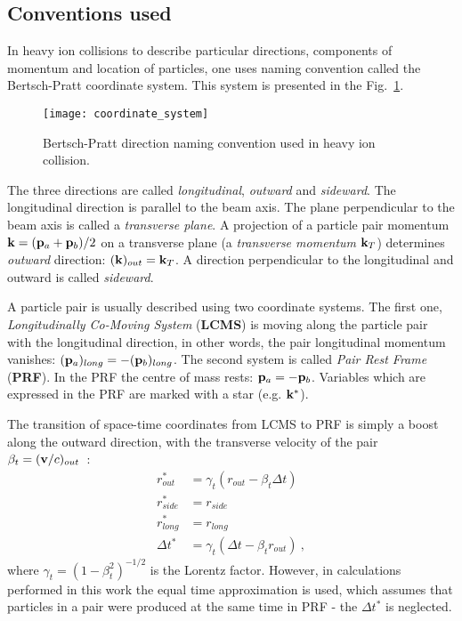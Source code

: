     \subsection{Conventions used}
      In heavy ion collisions to describe particular directions, components of momentum and location of particles, one uses naming convention called the Bertsch-Pratt coordinate system.
      This system is presented in the Fig.~\ref{fig:coordinate-system}.
      \begin{figure}[h]
        \centering
        \texttt{[image: coordinate\_system]}
        \caption{Bertsch-Pratt direction naming convention used in heavy ion collision.}
        \label{fig:coordinate-system}
      \end{figure}
      The three directions are called \textit{longitudinal}, \textit{outward} and \textit{sideward}.
      The longitudinal direction is parallel to the beam axis.
      The plane perpendicular to the beam axis is called a \textit{transverse plane}.
      A projection of a particle pair momentum $\mathbf{k} = (\mathbf{p}_a + \mathbf{p}_b)/2$ on a transverse plane (a \textit{transverse momentum} $\mathbf{k}_T$) determines \textit{outward} direction: $(\mathbf{k})_{out} = \mathbf{k}_T$.
      A direction perpendicular to the longitudinal and outward is called \textit{sideward}.

      A particle pair is usually described using two coordinate systems.
      The first one, \textit{Longitudinally Co-Moving System} (\textbf{LCMS}) is moving along the particle pair with the longitudinal direction, in other words, the pair longitudinal momentum vanishes: $(\mathbf{p}_a)_{long} = -(\mathbf{p}_b)_{long} $.
      The second system is called \textit{Pair Rest Frame} (\textbf{PRF}).
      In the PRF the centre of mass rests: $\mathbf{p}_a = -\mathbf{p}_b$.
      Variables which are expressed in the PRF are marked with a star (e.g. $\mathbf{k}^{*}$).

      The transition of space-time coordinates from LCMS to PRF is simply a boost along the outward direction, with the transverse velocity of the pair~$\beta_t = (\mathbf{v}/c)_{out}$~\cite{nonidfemto}:
      \begin{align}
        \label{eq:lcmstoprf}
        r^{*}_{out} &= \gamma_{t}(r_{out} - \beta_{t} \Delta t)\\
        r^{*}_{side} &= r_{side}\\
        r^{*}_{long} &= r_{long}\\
        \Delta t^{*} &= \gamma_{t}(\Delta t - \beta_{t} r_{out})~,
      \end{align}
      where $\gamma_{t} = (1-\beta^{2}_{t})^{-1/2}$ is the Lorentz factor.
      However, in calculations performed in this work the equal time approximation is used, which assumes that particles in a pair were produced at the same time in PRF - the $\Delta t^{*}$ is neglected.

